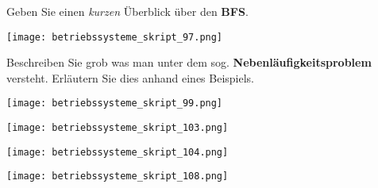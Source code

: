 \documentclass{article}
\begin{document}
\begin{tcolorbox}[colback=white!10!white,colframe=lightgray!75!black,
  savelowerto=\jobname_ex.tex,breakable,enhanced,lines before break=40]

\justifying
Geben Sie einen \textit{kurzen} Überblick über den \textbf{BFS}.

\tcblower

\justifying
\begin{center}
\texttt{[image: betriebssysteme\_skript\_97.png]}
\end{center}

\end{tcolorbox}
\begin{tcolorbox}[colback=white!10!white,colframe=lightgray!75!black,
  savelowerto=\jobname_ex.tex,breakable,enhanced,lines before break=40]

\justifying
Beschreiben Sie grob was man unter dem sog. \textbf{Nebenläufigkeitsproblem} versteht. Erläutern Sie dies anhand eines Beispiels.

\tcblower

\justifying
\begin{center}
\texttt{[image: betriebssysteme\_skript\_99.png]}
\end{center}
\begin{center}
\texttt{[image: betriebssysteme\_skript\_103.png]}
\end{center}
\begin{center}
\texttt{[image: betriebssysteme\_skript\_104.png]}
\end{center}
\begin{center}
\texttt{[image: betriebssysteme\_skript\_108.png]}
\end{center}

\end{tcolorbox}
\end{document}
